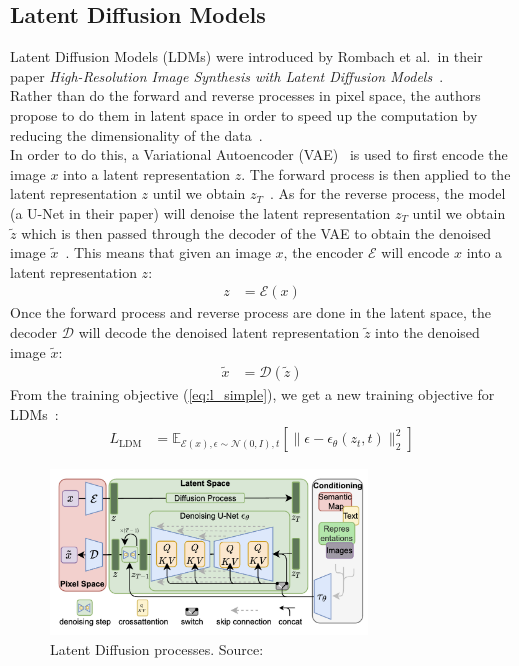 \documentclass{article}
\numberwithin{equation}{section}
\numberwithin{figure}{section}
\begin{document}
\subsection{Latent Diffusion Models}
Latent Diffusion Models (LDMs) were introduced by Rombach et al.\ in their paper \textit{High-Resolution Image Synthesis with Latent Diffusion Models}~\cite{rombach2022highresolution}. \\
Rather than do the forward and reverse processes in pixel space, the authors propose to do them in latent space in order to speed up the computation by reducing the dimensionality of the data~\cite{rombach2022highresolution}. \\
In order to do this, a Variational Autoencoder (VAE)~\cite{kingma2022autoencoding} is used to first encode the image $x$ into a latent representation $z$. The forward process is then applied to the latent representation $z$ until we obtain $z_T$~\cite{rombach2022highresolution}.
As for the reverse process, the model (a U-Net in their paper) will denoise the latent representation $z_T$ until we obtain $\tilde{z}$ which is then passed through the decoder of the VAE to obtain the denoised image $\tilde{x}$~\cite{rombach2022highresolution}.
This means that given an image $x$, the encoder $\mathcal{E}$ will encode $x$ into a latent representation $z$:
\begin{align}
  z &= \mathcal{E}(x)
\end{align}
Once the forward process and reverse process are done in the latent space, the decoder $\mathcal{D}$ will decode the denoised latent representation $\tilde{z}$ into the denoised image $\tilde{x}$:
\begin{align}
  \tilde{x} &= \mathcal{D}(\tilde{z})
\end{align}
From the training objective (\ref{eq:l_simple}), we get a new training objective for LDMs~\cite{rombach2022highresolution}:
\begin{align}
  L_{\text{LDM}} &= \mathbb{E}_{\mathcal{E}(x), \epsilon \sim \mathcal{N}(0, I), t} \left[ \| \epsilon - \epsilon_\theta (z_t, t) \|_2^2 \right]
\end{align}
\begin{figure}[h]
  \begin{center}
    \includegraphics[width=0.75\textwidth]{images/latentdiffusion.png}
    \caption{Latent Diffusion processes. Source:~\cite{rombach2022highresolution}}
  \end{center}
\end{figure}
\end{document}
